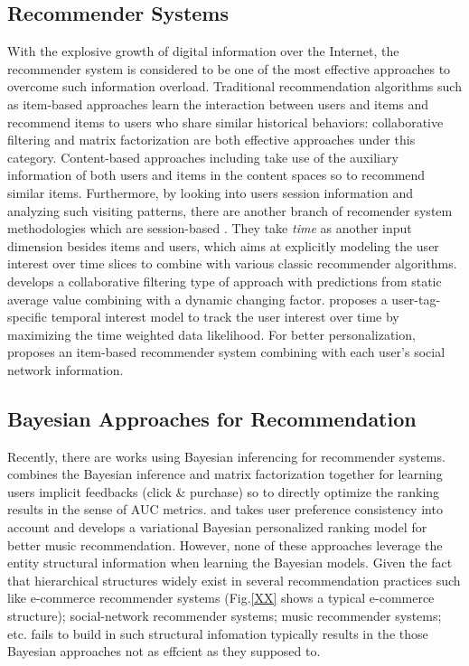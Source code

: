 \subsection{Recommender Systems}

With the explosive growth of digital information over the Internet, the recommender system is considered to be one of the most effective approaches to overcome such information overload. Traditional recommendation algorithms such as item-based approaches learn the interaction between users and items and recommend items to users who share similar historical behaviors: collaborative filtering \cite{Sarwar:2001:ICF:371920.372071,Su:2009:SCF:1592474.1722966} and matrix factorization \cite{Rendle:2010:FPM} are both effective approaches under this category.  Content-based approaches including \cite{2011rsh..book...73L,Liu:2011,Yuan:2015} take use of the auxiliary information of both users and items in the content spaces so to recommend similar items.  Furthermore, by looking into users session information and analyzing such visiting patterns, there are another branch of recomender system methodologies which are session-based \cite{Gultekin_acollaborative,Tang_review:2013}.  They take \emph{time} as another input dimension besides items and users, which aims at explicitly modeling the user interest over time slices to combine with various classic recommender algorithms. \cite{Koren:2010} develops a collaborative filtering type of approach with predictions from static average value combining with a dynamic changing factor.  \cite{Yin:2011} proposes a user-tag-specific temporal interest model to track the user interest over time by maximizing the time weighted data likelihood.  For better personalization, \cite{Guy:2009} proposes an item-based recommender system combining with each user's social network information. 
\subsection{Bayesian Approaches for Recommendation}

Recently, there are works using Bayesian inferencing for recommender systems. \cite{rendle2009bpr} combines the Bayesian inference and matrix factorization together for learning users implicit feedbacks (click \& purchase) so to directly optimize the ranking results in the sense of AUC metrics. \cite{Ben-Elazar:2017} and \cite{zhang2007efficient} takes user preference consistency into account and develops a variational Bayesian personalized ranking model for better music recommendation.  However, none of these approaches leverage the entity structural information when learning the Bayesian models.  Given the fact that hierarchical structures widely exist in several recommendation practices such like e-commerce recommender systems (Fig.\ref{XX} shows a typical e-commerce structure); social-network recommender systems; music recommender systems; etc. fails to build in such structural infomation typically results in the those Bayesian approaches not as effcient as they supposed to.  

